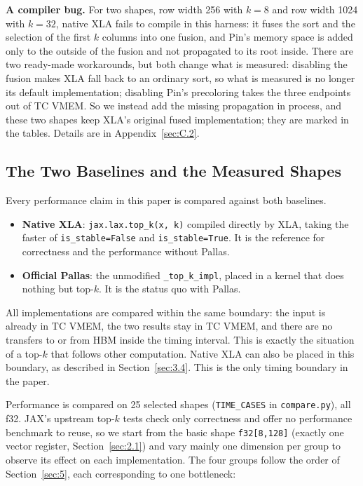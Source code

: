 \documentclass[sigconf,nonacm,balance=false]{acmart}
\newcommand{\code}[1]{\texttt{#1}}
\begin{document}
\textbf{A compiler bug.} For two shapes, row width 256 with $k = 8$ and row width 1024 with $k = 32$, native XLA fails to compile in this harness: it fuses the sort and the selection of the first $k$ columns into one fusion, and Pin's memory space is added only to the outside of the fusion and not propagated to its root inside. There are two ready-made workarounds, but both change what is measured: disabling the fusion makes XLA fall back to an ordinary sort, so what is measured is no longer its default implementation; disabling Pin's precoloring takes the three endpoints out of TC VMEM. So we instead add the missing propagation in process, and these two shapes keep XLA's original fused implementation; they are marked \ddag{} in the tables. Details are in Appendix~\ref{sec:C.2}.

\subsection{The Two Baselines and the Measured Shapes}
\label{sec:3.5}

Every performance claim in this paper is compared against both baselines.

\begin{itemize}
\item \textbf{Native XLA}: \code{jax.\allowbreak{}lax.\allowbreak{}top\_\allowbreak{}k(\allowbreak{}x,\allowbreak{} k)} compiled directly by XLA, taking the faster of \code{is\_\allowbreak{}stable=\allowbreak{}False} and \code{is\_\allowbreak{}stable=\allowbreak{}True}. It is the reference for correctness and the performance without Pallas.
\item \textbf{Official Pallas}: the unmodified \code{\_\allowbreak{}top\_\allowbreak{}k\_\allowbreak{}impl}, placed in a kernel that does nothing but top-$k$. It is the status quo with Pallas.
\end{itemize}

All implementations are compared within the same boundary: the input is already in TC VMEM, the two results stay in TC VMEM, and there are no transfers to or from HBM inside the timing interval. This is exactly the situation of a top-$k$ that follows other computation. Native XLA can also be placed in this boundary, as described in Section~\ref{sec:3.4}. This is the only timing boundary in the paper.

Performance is compared on 25 selected shapes (\code{TIME\_\allowbreak{}CASES} in \code{compare.\allowbreak{}py}), all f32. JAX's upstream top-$k$ tests check only correctness and offer no performance benchmark to reuse, so we start from the basic shape \code{f32[8,\allowbreak{}128]} (exactly one vector register, Section~\ref{sec:2.1}) and vary mainly one dimension per group to observe its effect on each implementation. The four groups follow the order of Section~\ref{sec:5}, each corresponding to one bottleneck:
\end{document}
